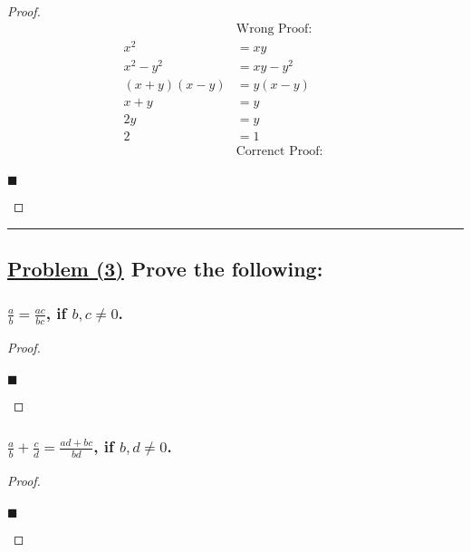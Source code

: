 \documentclass[letterpaper, 10 pt, conference]{ieeeconf}  %
\begin{document}
\begin{proof}
\begin{align}
    &\text{Wrong Proof: }&&\\
    x^2 &= xy&&\\
    x^2 - y^2 &= xy - y^2&&\\
    (x + y)(x - y) &= y(x - y)&&\\
    x + y&= y&&\\
    2y &= y &&\\
    2& = 1&&\\
    &\text{Correnct Proof: }&&\\
\end{align}
\begin{flushright}
$\blacksquare$
\end{flushright}
\end{proof}

\noindent\rule{8cm}{0.4pt}

\subsection{\textbf{\underline{Problem (3)} Prove the following: }}

\subsubsection{\textbf{$\frac{a}{b} = \frac{ac}{bc}$, if $b, c \neq 0$.}}
\begin{proof}
\begin{align}
    
\end{align}
\begin{flushright}
$\blacksquare$
\end{flushright}
\end{proof}

\subsubsection{\textbf{$\frac{a}{b} + \frac{c}{d} = \frac{ad + bc}{bd}$, if $b, d \neq 0$.}}
\begin{proof}
\begin{align}
    
\end{align}
\begin{flushright}
$\blacksquare$
\end{flushright}
\end{proof}
\end{document}
